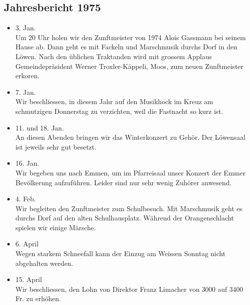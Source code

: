 \subsection{Jahresbericht 1975}

\begin{history}

    \begin{itemize}

        \item[]3. Jan.\\
        Um 20 Uhr holen wir den Zunftmeister von 1974 Alois Gassmann bei seinem
        Hause ab. Dann geht es mit Fackeln und Marschmusik durchs Dorf in den
        Löwen. Nach den üblichen Traktanden wird mit grossem Applaus
        Gemeindepräsident Werner Troxler-Käppeli, Moos, zum neuen Zunftmeister
        erkoren.

        \item[]7. Jan.\\
        Wir beschliessen, in diesem Jahr auf den Musikhock im Kreuz am
        schmutzigen Donnerstag zu verzichten, weil die Fastnacht so kurz ist.

        \item[]11. und 18. Jan.\\
        An diesen Abenden bringen wir das Winterkonzert zu Gehör. Der Löwensaal
        ist jeweils sehr gut besetzt.

        \item[]16. Jan.\\
        Wir begeben uns nach Emmen, um im Pfarreisaal unser Konzert der Emmer
        Bevölkerung aufzuführen. Leider sind nur sehr wenig Zuhörer anwesend.

        \item[]4. Feb.\\
        Wir begleiten den Zunftmeister zum Schulbesuch. Mit Marschmusik geht es
        durchs Dorf auf den alten Schulhausplatz. Während der Orangenschlacht
        spielen wir einige Märsche.

        \item[]6. April\\
        Wegen starkem Schneefall kann der Einzug am Weissen Sonntag nicht
        abgehalten werden.

        \item[]15. April\\
        Wir beschliessen, den Lohn von Direktor Franz Limacher von 3000 auf 3400
        Fr. zu erhöhen.


\end{itemize}
\end{history}
